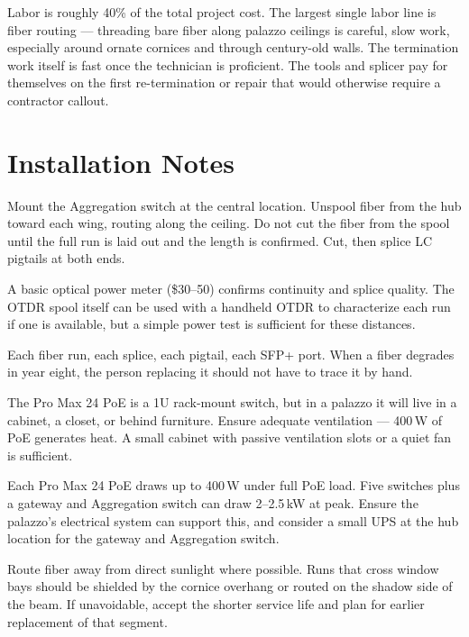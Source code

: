 \documentclass[10pt, letterpaper]{article}
\begin{document}
Labor is roughly 40\% of the total project cost. The largest single labor line is fiber routing --- threading bare fiber along palazzo ceilings is careful, slow work, especially around ornate cornices and through century-old walls. The termination work itself is fast once the technician is proficient. The tools and splicer pay for themselves on the first re-termination or repair that would otherwise require a contractor callout.

\section{Installation Notes}

\begin{description}[style=nextline, leftmargin=0.6em, itemsep=0.5em]
  \item[Start from the hub outward.] Mount the Aggregation switch at the central location. Unspool fiber from the hub toward each wing, routing along the ceiling. Do not cut the fiber from the spool until the full run is laid out and the length is confirmed. Cut, then splice LC pigtails at both ends.
  \item[Test each run before moving on.] A basic optical power meter (\$30--50) confirms continuity and splice quality. The OTDR spool itself can be used with a handheld OTDR to characterize each run if one is available, but a simple power test is sufficient for these distances.
  \item[Label everything.] Each fiber run, each splice, each pigtail, each SFP+ port. When a fiber degrades in year eight, the person replacing it should not have to trace it by hand.
  \item[Hide the switches.] The Pro Max 24 PoE is a 1U rack-mount switch, but in a palazzo it will live in a cabinet, a closet, or behind furniture. Ensure adequate ventilation --- 400\,W of PoE generates heat. A small cabinet with passive ventilation slots or a quiet fan is sufficient.
  \item[Power considerations.] Each Pro Max 24 PoE draws up to 400\,W under full PoE load. Five switches plus a gateway and Aggregation switch can draw 2--2.5\,kW at peak. Ensure the palazzo's electrical system can support this, and consider a small UPS at the hub location for the gateway and Aggregation switch.
  \item[UV exposure.] Route fiber away from direct sunlight where possible. Runs that cross window bays should be shielded by the cornice overhang or routed on the shadow side of the beam. If unavoidable, accept the shorter service life and plan for earlier replacement of that segment.
\end{description}
\end{document}
